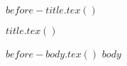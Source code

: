 \makeatletter
{}
\newcommand{\tightlist}
\makeatother

$before-title.tex()$

$title.tex()$


$before-body.tex()$
$body$

